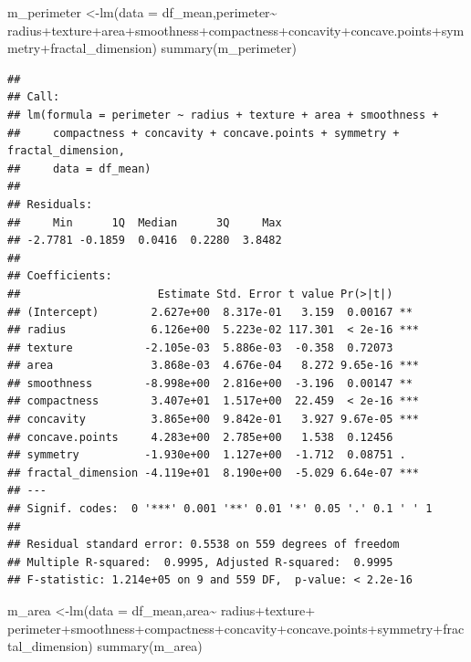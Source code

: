 \documentclass[
  11pt,
]{article}
\newenvironment{Shaded}{\begin{snugshade}}{\end{snugshade}}
\newcommand{\AttributeTok}[1]{\textcolor[rgb]{0.77,0.63,0.00}{#1}}
\newcommand{\FunctionTok}[1]{\textcolor[rgb]{0.00,0.00,0.00}{#1}}
\newcommand{\NormalTok}[1]{#1}
\newcommand{\OtherTok}[1]{\textcolor[rgb]{0.56,0.35,0.01}{#1}}
\newcommand{\SpecialCharTok}[1]{\textcolor[rgb]{0.00,0.00,0.00}{#1}}
\begin{document}
\begin{Shaded}
\begin{Highlighting}[]
\NormalTok{m\_perimeter }\OtherTok{\textless{}{-}}\FunctionTok{lm}\NormalTok{(}\AttributeTok{data =}\NormalTok{ df\_mean,perimeter}\SpecialCharTok{\textasciitilde{}}\NormalTok{ radius}\SpecialCharTok{+}\NormalTok{texture}\SpecialCharTok{+}\NormalTok{area}\SpecialCharTok{+}\NormalTok{smoothness}\SpecialCharTok{+}\NormalTok{compactness}\SpecialCharTok{+}\NormalTok{concavity}\SpecialCharTok{+}\NormalTok{concave.points}\SpecialCharTok{+}\NormalTok{symmetry}\SpecialCharTok{+}\NormalTok{fractal\_dimension)}
\FunctionTok{summary}\NormalTok{(m\_perimeter)}
\end{Highlighting}
\end{Shaded}

\begin{verbatim}
## 
## Call:
## lm(formula = perimeter ~ radius + texture + area + smoothness + 
##     compactness + concavity + concave.points + symmetry + fractal_dimension, 
##     data = df_mean)
## 
## Residuals:
##     Min      1Q  Median      3Q     Max 
## -2.7781 -0.1859  0.0416  0.2280  3.8482 
## 
## Coefficients:
##                     Estimate Std. Error t value Pr(>|t|)    
## (Intercept)        2.627e+00  8.317e-01   3.159  0.00167 ** 
## radius             6.126e+00  5.223e-02 117.301  < 2e-16 ***
## texture           -2.105e-03  5.886e-03  -0.358  0.72073    
## area               3.868e-03  4.676e-04   8.272 9.65e-16 ***
## smoothness        -8.998e+00  2.816e+00  -3.196  0.00147 ** 
## compactness        3.407e+01  1.517e+00  22.459  < 2e-16 ***
## concavity          3.865e+00  9.842e-01   3.927 9.67e-05 ***
## concave.points     4.283e+00  2.785e+00   1.538  0.12456    
## symmetry          -1.930e+00  1.127e+00  -1.712  0.08751 .  
## fractal_dimension -4.119e+01  8.190e+00  -5.029 6.64e-07 ***
## ---
## Signif. codes:  0 '***' 0.001 '**' 0.01 '*' 0.05 '.' 0.1 ' ' 1
## 
## Residual standard error: 0.5538 on 559 degrees of freedom
## Multiple R-squared:  0.9995, Adjusted R-squared:  0.9995 
## F-statistic: 1.214e+05 on 9 and 559 DF,  p-value: < 2.2e-16
\end{verbatim}

\begin{Shaded}
\begin{Highlighting}[]
\NormalTok{m\_area }\OtherTok{\textless{}{-}}\FunctionTok{lm}\NormalTok{(}\AttributeTok{data =}\NormalTok{ df\_mean,area}\SpecialCharTok{\textasciitilde{}}\NormalTok{ radius}\SpecialCharTok{+}\NormalTok{texture}\SpecialCharTok{+}\NormalTok{ perimeter}\SpecialCharTok{+}\NormalTok{smoothness}\SpecialCharTok{+}\NormalTok{compactness}\SpecialCharTok{+}\NormalTok{concavity}\SpecialCharTok{+}\NormalTok{concave.points}\SpecialCharTok{+}\NormalTok{symmetry}\SpecialCharTok{+}\NormalTok{fractal\_dimension)}
\FunctionTok{summary}\NormalTok{(m\_area)}
\end{Highlighting}
\end{Shaded}
\end{document}
